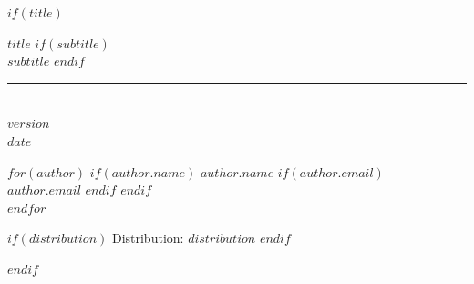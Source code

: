 \documentclass[10pt, letterpaper, titlepage, oneside, openright, final, article]{memoir}
\begin{document}
%
$if(title)$
    \ifpdf
    \fi
    \newlength{\centeroffset}
    \thispagestyle{empty}
    \vspace*{2.0in}
    \begin{flushleft}
        {
            {\fontsize{20.28pt}{22pt}$title$}
            $if(subtitle)$
                {\\\fontsize{18.28pt}{22pt}$subtitle$}
            $endif$
        }
        \noindent\rule[-1ex]{\textwidth}{1pt}\\[2.8ex]

        {\fontsize{12pt}{22pt}$version$}\\[0.05in]
        {\fontsize{12pt}{22pt}$date$}\\[0.05in]


        \vspace*{\fill}

        $for(author)$
            $if(author.name)$
                {\fontsize{13pt}{15pt}$author.name$}
                $if(author.email)$
                    {\\[0.05in]\fontsize{12pt}{14pt}$author.email$}
                $endif$
            $endif$
            \\[0.2in]
        $endfor$

        \vspace*{0.5in}

        $if(distribution)$
            {\fontsize{12pt}{14pt}Distribution: $distribution$}
        $endif$
    \end{flushleft}
$endif$
\end{document}
